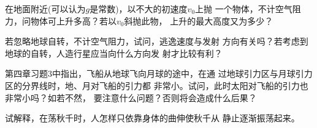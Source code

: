 \begin{questions}
  \question 在地面附近(可以认为$ g $是常数)，以不大的初速度$ v_0 $上抛
  一个物体，不计空气阻力，问物体可上升多高？若以$ v _ { 0 } $斜抛此物，
  上升的最大高度又为多少？

  \question 若忽略地球自转，不计空气阻力，试问，逃逸速度与发射
  方向有关吗？若考虑到地球的自转，人造行星应当向什么方向发
  射才比较有利？

  \question 第四章习题3中指出，飞船从地球飞向月球的途中，在通
  过地球引力区与月球引力区的分界线时，地、月对飞船的引力都
  非常小。试问，此时太阳对飞船的引力也非常小吗？如若不然，
  要注意什么问题？否则将会造成什么后果？

  \question 试解释，在荡秋千时，人怎样只依靠身体的曲伸使秋千从
  静止逐渐振荡起来。

\end{questions}
